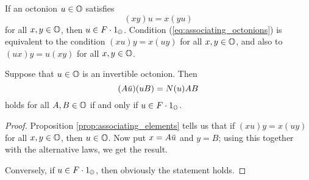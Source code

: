 \begin{proposition}
	\label{prop:associating_elements}
	If an octonion $u \in \mathbb{O}$ satisfies
	\begin{equation}
		\label{eq:associating_octonions}
		(xy)u = x(yu)
	\end{equation}
	for all $x,y \in \mathbb{O}$, then $u \in F\cdot 1_{\mathbb{O}}$. Condition (\ref{eq:associating_octonions})
	is equivalent to the condition $(xu)y = x(uy)$ for all $x,y \in \mathbb{O}$, and also to
	$(ux)y = u(xy)$ for all $x,y \in \mathbb{O}$. 
\end{proposition}

\begin{corollary}
	\label{cor:1_auub}
	Suppose that $u\in \mathbb{O}$ is an invertible octonion. Then
	\begin{equation}
		(A\mathord{\mbox{\hspace*{0pt}}\,\overline{\!u\!\!\;}\!\:}\mbox{\hspace*{0pt}})(u B) = N(u) AB
	\end{equation}
	holds for all $A,B \in \mathbb{O}$ if and only if $u \in F \cdot 1_{\mathbb{O}}$. 
\end{corollary}

\begin{proof}
	Proposition \ref{prop:associating_elements} tells us that if $(xu) y = x(uy)$ for all
	$x,y \in \mathbb{O}$, then $u \in \mathbb{O}$. Now put $x = A\mathord{\mbox{\hspace*{0pt}}\,\overline{\!u\!\!\;}\!\:}\mbox{\hspace*{0pt}}$ and $y = B$; using this together with
	the alternative laws, we get the result. 
	
	Conversely, if $u \in F\cdot 1_{\mathbb{O}}$, then obviously the statement holds. 
\end{proof}



